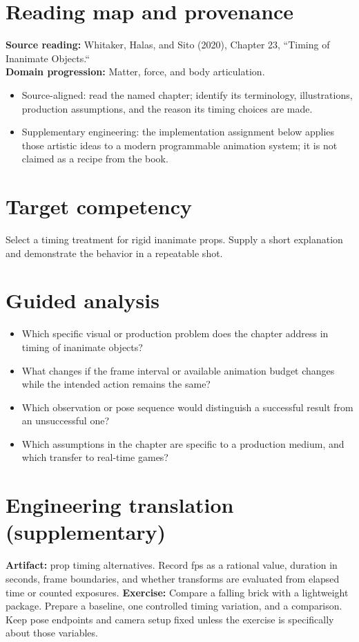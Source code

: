 \documentclass[10pt,letterpaper]{article}
\begin{document}
\makedoctitle
\makedocsummary

\section{Reading map and provenance}
\textbf{Source reading:} Whitaker, Halas, and Sito (2020), Chapter 23, ``Timing of Inanimate Objects.``\\
\textbf{Domain progression:} Matter, force, and body articulation.
\begin{itemize}
\item Source-aligned: read the named chapter; identify its terminology, illustrations, production assumptions, and the reason its timing choices are made.
\item Supplementary engineering: the implementation assignment below applies those artistic ideas to a modern programmable animation system; it is not claimed as a recipe from the book.
\end{itemize}
\section{Target competency}
Select a timing treatment for rigid inanimate props. Supply a short explanation and demonstrate the behavior in a repeatable shot.
\section{Guided analysis}
\begin{itemize}
\item Which specific visual or production problem does the chapter address in timing of inanimate objects?
\item What changes if the frame interval or available animation budget changes while the intended action remains the same?
\item Which observation or pose sequence would distinguish a successful result from an unsuccessful one?
\item Which assumptions in the chapter are specific to a production medium, and which transfer to real-time games?
\end{itemize}
\section{Engineering translation (supplementary)}
\textbf{Artifact:} prop timing alternatives. Record fps as a rational value, duration in seconds, frame boundaries, and whether transforms are evaluated from elapsed time or counted exposures.
\textbf{Exercise:} Compare a falling brick with a lightweight package. Prepare a baseline, one controlled timing variation, and a comparison. Keep pose endpoints and camera setup fixed unless the exercise is specifically about those variables.
\end{document}
